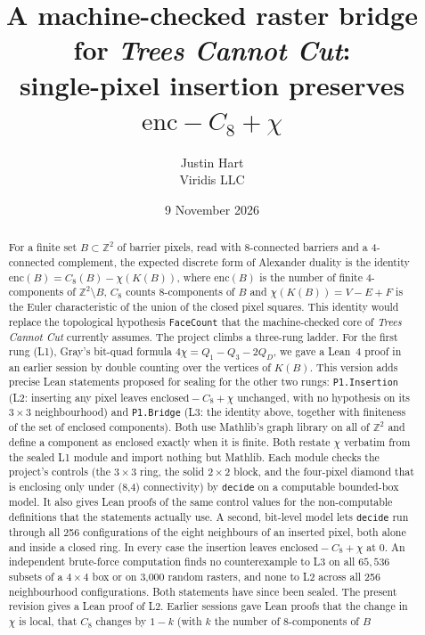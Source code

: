 \documentclass[11pt]{article}
\title{A machine-checked raster bridge for \emph{Trees Cannot Cut}:\\
single-pixel insertion preserves $\mathrm{enc}-C_8+\chi$}
\author{Justin Hart\\Viridis LLC}
\date{9 November 2026}
\theoremstyle{definition}
\theoremstyle{remark}
\begin{document}
\maketitle

\begin{abstract}
For a finite set $B\subset\mathbb{Z}^2$ of barrier pixels, read with
8-connected barriers and a 4-connected complement, the expected discrete form of
Alexander duality is the identity
$\mathrm{enc}(B) = C_8(B)-\chi(K(B))$, where $\mathrm{enc}(B)$ is the number
of finite 4-components of $\mathbb{Z}^2\setminus B$, $C_8$ counts 8-components of $B$ and $\chi(K(B))=V-E+F$ is the Euler
characteristic of the union of the closed pixel squares. This identity would
replace the topological hypothesis \texttt{FaceCount} that the machine-checked
core of \emph{Trees Cannot Cut} currently assumes. The project climbs a
three-rung ladder. For the first rung (L1), Gray's bit-quad formula
$4\chi = Q_1-Q_3-2Q_D$, we gave a Lean~4 proof in an earlier session by
double counting over the vertices of $K(B)$. This version adds precise Lean
statements proposed for sealing for the other two rungs: \texttt{P1.Insertion}
(L2: inserting any pixel leaves $\text{enclosed}-C_8+\chi$ unchanged, with no
hypothesis on its $3\times3$ neighbourhood) and \texttt{P1.Bridge} (L3: the
identity above, together with finiteness of the set of enclosed components).
Both use Mathlib's graph library on all of $\mathbb{Z}^2$ and define a component
as enclosed exactly when it is finite. Both restate $\chi$ verbatim from the sealed L1
module and import nothing but Mathlib. Each module checks the project's controls (the $3\times3$ ring, the
solid $2\times2$ block, and the four-pixel diamond that is enclosing only under
(8,4) connectivity) by \texttt{decide} on a computable bounded-box model. It also
gives Lean proofs of the same control values for the non-computable definitions
that the statements actually use. A second, bit-level model lets \texttt{decide}
run through all 256 configurations of the eight neighbours of an inserted pixel,
both alone and inside a closed ring. In every case the insertion leaves
$\text{enclosed}-C_8+\chi$ at $0$. An independent brute-force computation finds
no counterexample to L3 on all $65{,}536$ subsets of a $4\times4$ box or on
3{,}000 random rasters, and none to L2 across all 256 neighbourhood
configurations. Both statements have since been sealed. The present revision
gives a Lean proof of L2. Earlier sessions gave Lean proofs that the change in $\chi$
is local, that $C_8$ changes by $1-k$ (with $k$ the number of 8-components of $B$

\end{abstract}
\end{document}
